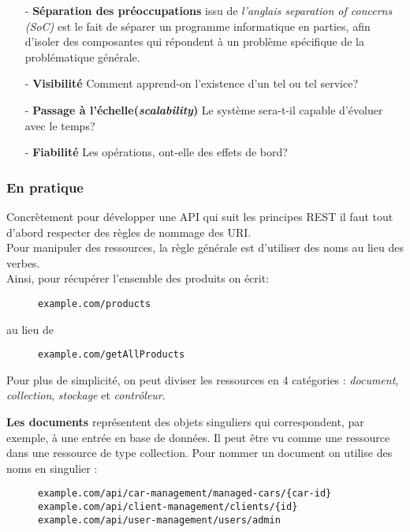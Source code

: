 \begin{itemize}
	\item [- \textbf{Séparation des préoccupations}] issu de \emph{l’anglais separation of concerns (SoC)} est le fait de séparer un programme informatique en parties, afin d'isoler des composantes qui répondent à un problème spécifique de la problématique générale.  
	\item [- \textbf{Visibilité}] Comment apprend-on l'existence d'un tel ou tel service? 
	\item [- \textbf{Passage à l'échelle(\emph{scalability})}] Le système sera-t-il capable d'évoluer avec le temps?
	\item [- \textbf{Fiabilité}] Les opérations, ont-elle des effets de bord? \cite{rest}
\end{itemize}


\subsubsection{En pratique}
Concrètement pour développer une API qui suit les principes REST il faut tout d'abord respecter des règles de nommage des URI. \\
Pour manipuler des ressources, la règle générale est d'utiliser des noms au lieu des verbes.\\
Ainsi, pour récupérer l'ensemble des produits on écrit:
\begin{figure}[h!]
	\begin{lstlisting}[frame=leftline]
example.com/products
	\end{lstlisting}
\end{figure}

au lieu de 


\begin{figure}[h!]
	\begin{lstlisting}[frame=leftline]
example.com/getAllProducts
	\end{lstlisting}
\end{figure}
 
Pour plus de simplicité, on peut diviser les ressources en 4 catégories : \emph{document}, \emph{collection}, \emph{stockage} et \emph{contrôleur}. 

\textbf{Les documents} représentent des objets singuliers qui  correspondent, par exemple, à une entrée en base de données. Il peut être vu comme une ressource dans une ressource de type collection. Pour nommer un document on utilise des noms en singulier : 
\begin{figure}[h!]
	\begin{lstlisting}[frame=leftline]
example.com/api/car-management/managed-cars/{car-id}
example.com/api/client-management/clients/{id}
example.com/api/user-management/users/admin
	\end{lstlisting}
\end{figure}

